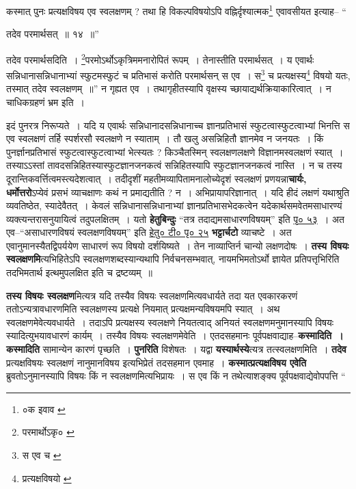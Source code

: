 \documentclass[article,12pt,a4paper]{memoir}
\begin{document}
	कस्मात् पुनः प्रत्यक्षविषय एव स्वलक्षणम् ? तथा हि विकल्पविषयोऽपि वह्निर्दृश्यात्मक\footnote{०क इवाव \cite{dp-msD}} एवावसीयत इत्याह-- “
	  
	तदेव परमार्थसत् ॥ १४ ॥” 
	  
	तदेव परमार्थसदिति । \footnote{परमार्थोऽकृ० \cite{dp-msA} \cite{dp-msB} \cite{dp-msC} \cite{dp-edP} \cite{dp-edH} \cite{dp-edE} \cite{dp-edN}}परमोऽर्थोऽकृत्रिममनारोपितं रूपम् । तेनास्तीति परमार्थसत् । य एवार्थः सन्निधानासन्निधानाभ्यां स्फुटमस्फुटं च प्रतिभासं करोति परमार्थसन् स एव । स\footnote{स एव च \cite{dp-msB} \cite{dp-edH} \cite{dp-edE} \cite{dp-edN}} च प्रत्यक्षस्य\footnote{प्रत्यक्षविषयो \cite{dp-msA} \cite{dp-msB} \cite{dp-msC} \cite{dp-msD} \cite{dp-edP} \cite{dp-edH} \cite{dp-edE} \cite{dp-edN}} विषयो यतः, तस्मात् तदेव स्वलक्षणम् ॥” न गृह्यत एव । तथागृहीतस्यापि वृक्षस्य च्छायाद्यर्थक्रियाकारित्वात् । न चाधिकग्रहणं भ्रम इति ।
	\pend
      

	  \pstart इदं पुनरत्र निरूप्यते । यदि य एवार्थः सन्निधानादसन्निधानाच्च ज्ञानप्रतिभासं स्फुटत्वास्फुटत्वाभ्यां भिनत्ति स एव स्वलक्षणं तर्हि स्पर्शरसौ स्वलक्षणे न स्याताम् । तौ खलु असन्निहितौ ज्ञानमेव न जनयतः । किं पुनर्ज्ञानप्रतिभासं स्फुटत्वास्फुटत्वाभ्यां भेत्स्यतः ? किञ्चैतस्मिन् स्वलक्षणलक्षणे विज्ञानमस्वलक्षणं स्यात् । तस्याऽऽस्तां तावदसन्निहितस्यास्फुटज्ञानजनकत्वं सन्निहितस्यापि स्फुटज्ञानजनकत्वं नास्ति । न च तस्य दूरान्तिकवर्त्तित्वमस्त्यदेशत्वात् । तदीदृशीं महतीमव्यापितामनालोच्येदृशं स्वलक्षणं प्रणयन्ना\textbf{चार्यः, धर्मोत्तरो}ऽप्येवं प्रसभं व्याचक्षाणः कथं न प्रमाद्यतीति ? न । अभिप्रायापरिज्ञानात् । यदि हीदं लक्षणं यथाश्रुति व्यवतिष्ठेत, स्यादेवैतत् । केवलं सन्निधानासन्निधानाभ्यां ज्ञानप्रतिभासभेदकत्वेन यदेकार्थसमवेतमसाधारण्यं व्यक्त्यन्तरासनुयायित्वं तदुपलक्षितम् । यतो \textbf{हेतुबिन्दुः} “तत्र तदाद्यमसाधारणविषयम्” इति \href{http://http://sarit.indology.info/?cref=hbṭ.1.28}{पृ० ५३} । अत एव--“असाधारणविषयं स्वलक्षणविषयम्” इति \href{http://http://sarit.indology.info/?cref=hbṭ.1.14}{हेतु० टी० पृ० २५} \textbf{भट्टार्चटो} व्याचष्टे । अत एवानुमानस्यैतद्विपर्ययेण साधारणं रूप विषयो दर्शयिष्यते । तेन नाव्याप्तिर्न चान्यो लक्षणदोषः । \textbf{तस्य विषयः स्वलक्षणमि}त्यभिहितेऽपि स्वलक्षणशब्दस्यान्यथापि निर्वचनसम्भवात्, नायमभिमतोऽर्थो ज्ञायेत प्रतिपत्तृभिरिति तदभिमतार्थ इत्थमुपलक्षित इति च द्रष्टव्यम् ॥
	\pend
      

	  \pstart \textbf{तस्य विषयः स्वलक्षण}मित्यत्र यदि तस्यैव विषयः स्वलक्षणमित्यवधार्यते तदा यत एवकारकरणं ततोऽन्यत्रावधारणमिति स्वलक्षणस्य प्रत्यक्षे नियमात् प्रत्यक्षमन्यविषयमपि स्यात् । अथ स्वलक्षणमेवेत्यवधार्यते । तदाऽपि प्रत्यक्षस्य स्वलक्षणे नियतत्वाद् \leavevmode{} अनियतं स्वलक्षणमनुमानस्यापि विषयः स्यादित्युभयावधारणं कार्यम् । तस्यैव विषयः स्वलक्षणमेवेति । एतदसहमानः पूर्वपक्षवाद्याह--\textbf{कस्मादिति । कस्मादिति} सामान्येन कारणं पृच्छति । \textbf{पुनरिति} विशेषतः । यद्वा \textbf{यस्यार्थस्ये}त्यत्र तत्स्वलक्षणमिति । \textbf{तदेव} प्रत्यक्षविषयः स्वलक्षणं नानुमानविषय इत्यभिप्रेतं तदसहमान एवमाह । \textbf{कस्मात्प्रत्यक्षविषय एवेति} ब्रुवतोऽनुमानस्यापि विषयः किं न स्वलक्षणमित्यभिप्रायः । स एव किं न तथेत्याशङ्क्य पूर्वपक्षवाद्येवोपपत्ति  \leavevmode{} “
	  
\end{document}
